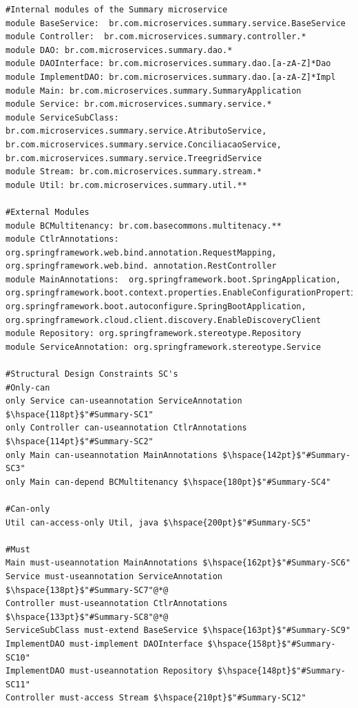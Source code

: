 \documentclass[12pt]{article}
\begin{document}
\begin{lstlisting}[style=colorido, caption={\textcolor{blue}{Summary microservice's architectural design specification.}},label={list:especArquiteturalSummary}
]
#Internal modules of the Summary microservice
module BaseService:  br.com.microservices.summary.service.BaseService
module Controller:  br.com.microservices.summary.controller.*
module DAO: br.com.microservices.summary.dao.*
module DAOInterface: br.com.microservices.summary.dao.[a-zA-Z]*Dao
module ImplementDAO: br.com.microservices.summary.dao.[a-zA-Z]*Impl
module Main: br.com.microservices.summary.SummaryApplication
module Service: br.com.microservices.summary.service.*
module ServiceSubClass: br.com.microservices.summary.service.AtributoService, br.com.microservices.summary.service.ConciliacaoService, br.com.microservices.summary.service.TreegridService
module Stream: br.com.microservices.summary.stream.*
module Util: br.com.microservices.summary.util.**

#External Modules
module BCMultitenancy: br.com.basecommons.multitenacy.**
module CtlrAnnotations: org.springframework.web.bind.annotation.RequestMapping, org.springframework.web.bind. annotation.RestController
module MainAnnotations:  org.springframework.boot.SpringApplication, org.springframework.boot.context.properties.EnableConfigurationProperties, org.springframework.boot.autoconfigure.SpringBootApplication, org.springframework.cloud.client.discovery.EnableDiscoveryClient
module Repository: org.springframework.stereotype.Repository
module ServiceAnnotation: org.springframework.stereotype.Service

#Structural Design Constraints SC's
#Only-can
only Service can-useannotation ServiceAnnotation $\hspace{118pt}$"#Summary-SC1" 
only Controller can-useannotation CtlrAnnotations	$\hspace{114pt}$"#Summary-SC2"
only Main can-useannotation MainAnnotations	$\hspace{142pt}$"#Summary-SC3"
only Main can-depend BCMultitenancy $\hspace{180pt}$"#Summary-SC4"

#Can-only	
Util can-access-only Util, java $\hspace{200pt}$"#Summary-SC5"

#Must
Main must-useannotation MainAnnotations	$\hspace{162pt}$"#Summary-SC6"
Service must-useannotation ServiceAnnotation $\hspace{138pt}$"#Summary-SC7"@*@
Controller must-useannotation CtlrAnnotations $\hspace{133pt}$"#Summary-SC8"@*@
ServiceSubClass must-extend BaseService	$\hspace{163pt}$"#Summary-SC9"
ImplementDAO must-implement DAOInterface $\hspace{158pt}$"#Summary-SC10"
ImplementDAO must-useannotation Repository $\hspace{148pt}$"#Summary-SC11"
Controller must-access Stream $\hspace{210pt}$"#Summary-SC12"
\end{lstlisting}
\end{document}
